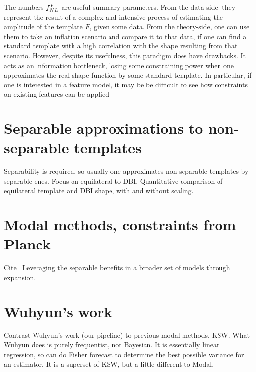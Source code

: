 The numbers $f_{NL}^F$ are useful summary parameters.
From the data-side, they represent the result of
a complex and intensive process
of estimating the amplitude of the template $F$,
given some data. From the theory-side, one
can use them to take an inflation scenario and compare it
to that data, if one can find a standard template
with a high correlation with the shape resulting
from that scenario.
However, despite its usefulness, this paradigm does
have drawbacks. It acts as an information bottleneck,
losing some constraining power when one approximates
the real shape function by some standard template.
In particular, if one is interested in a feature model,
it may be be difficult to see how constraints on existing
features can be applied.
    \section{Separable approximations to non-separable templates}
    Separability is required, so usually one approximates non-separable templates
    by separable ones.
    Focus on equilateral to DBI.
    Quantitative comparison of equilateral template and DBI shape,
    with and without scaling.

    \section{Modal methods, constraints from Planck}
    Cite~\cite{FergShell_2014}
    Leveraging the separable benefits in a broader set of models through expansion.
    \section{Wuhyun's work}
    Contrast Wuhyun's work (our pipeline) to previous modal methods, KSW.
    What Wuhyun does is purely frequentist, not Bayesian. It is essentially linear regression, so can do Fisher forecast to determine
    the best possible variance for an estimator.
    It is a superset of KSW, but a little different to Modal.
    

